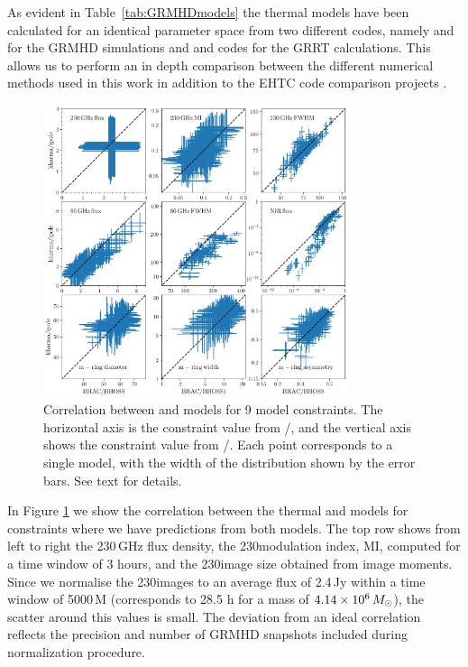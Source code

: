 

As evident in Table~\ref{tab:GRMHDmodels} the thermal models have been calculated for an identical parameter space from two different codes, namely \kharma and \bhac for the GRMHD simulations and \ipole and \bhoss codes for the GRRT calculations. This allows us to perform an in depth comparison between the different numerical methods used in this work in addition to the EHTC code comparison projects \citep{2019ApJS..243...26P,2020ApJ...897..148G}.

\begin{figure}
  \centering
  \includegraphics[width=0.8\textwidth]{./figures/BHAC_iharm_correlation2}
  \caption{Correlation between \bhac and \kharma models for 9 model constraints.  The horizontal axis is the constraint value from \bhac/\bhoss, and the vertical axis shows the constraint value from \kharma/\ipole.  Each point corresponds to a single model, with the width of the distribution shown by the error bars.  See text for details.}
  \label{fig:modelcorrelation}
\end{figure}

In Figure \ref{fig:modelcorrelation} we show the correlation between the thermal \kharma and \bhac models for constraints where we have predictions from both models.  The top row shows from left to right the 230\,GHz flux density, the 230\GHz modulation index, MI, computed for a time window of 3 hours, and the 230\GHz image size obtained from image moments. Since we normalise the 230\GHz images to an average flux of 2.4\,Jy within a time window of 5000\,M (corresponds to 28.5 h for \sgra a mass of $4.14\times 10^6\,M_\odot$), the scatter around this values is small. The deviation from an ideal correlation reflects the precision and number of GRMHD snapshots included during normalization procedure.

